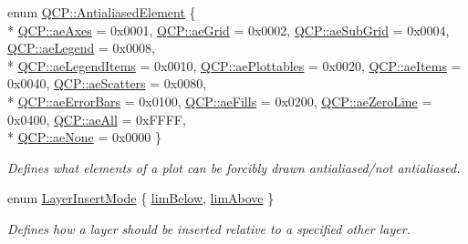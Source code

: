 \begin{DoxyCompactItemize}
enum \hyperlink{a00143_ae55dbe315d41fe80f29ba88100843a0c}{Q\+C\+P\+::\+Antialiased\+Element} \{ \\*
\hyperlink{a00143_ae55dbe315d41fe80f29ba88100843a0caefa92e89cd37f8a081fd2075aa1af73f}{Q\+C\+P\+::ae\+Axes} = 0x0001, 
\hyperlink{a00143_ae55dbe315d41fe80f29ba88100843a0ca4fbb37118d62288af0ca601ff2b07a2f}{Q\+C\+P\+::ae\+Grid} = 0x0002, 
\hyperlink{a00143_ae55dbe315d41fe80f29ba88100843a0caaedf83369188a15a69f92bb1d85ca97b}{Q\+C\+P\+::ae\+Sub\+Grid} = 0x0004, 
\hyperlink{a00143_ae55dbe315d41fe80f29ba88100843a0ca9e0127a6361b5d0596b031a482c5cf97}{Q\+C\+P\+::ae\+Legend} = 0x0008, 
\\*
\hyperlink{a00143_ae55dbe315d41fe80f29ba88100843a0ca1aca7a50c1b95403958733a4acafe773}{Q\+C\+P\+::ae\+Legend\+Items} = 0x0010, 
\hyperlink{a00143_ae55dbe315d41fe80f29ba88100843a0ca4145e4251b0cf2dbedabeea0a38f84f6}{Q\+C\+P\+::ae\+Plottables} = 0x0020, 
\hyperlink{a00143_ae55dbe315d41fe80f29ba88100843a0caf7712a85d6b0c75b24301d2fe9484db3}{Q\+C\+P\+::ae\+Items} = 0x0040, 
\hyperlink{a00143_ae55dbe315d41fe80f29ba88100843a0cae45ed8cd167bffe27d7f40da4bc17e9c}{Q\+C\+P\+::ae\+Scatters} = 0x0080, 
\\*
\hyperlink{a00143_ae55dbe315d41fe80f29ba88100843a0ca9dcf3882cb321bb305f71fdc0f09f63d}{Q\+C\+P\+::ae\+Error\+Bars} = 0x0100, 
\hyperlink{a00143_ae55dbe315d41fe80f29ba88100843a0ca788810f0aa930137de6ad6cc6d83d354}{Q\+C\+P\+::ae\+Fills} = 0x0200, 
\hyperlink{a00143_ae55dbe315d41fe80f29ba88100843a0ca261f8ea78cf3c9561726223ffa33dc12}{Q\+C\+P\+::ae\+Zero\+Line} = 0x0400, 
\hyperlink{a00143_ae55dbe315d41fe80f29ba88100843a0caa897c232a0ffc8368e7c100ffc59ef31}{Q\+C\+P\+::ae\+All} = 0x\+F\+F\+F\+F, 
\\*
\hyperlink{a00143_ae55dbe315d41fe80f29ba88100843a0caa9e90d81896358757d94275aeaa58f6a}{Q\+C\+P\+::ae\+None} = 0x0000
 \}
\begin{DoxyCompactList}\small\item\em Defines what elements of a plot can be forcibly drawn antialiased/not antialiased. \end{DoxyCompactList}\item 
enum \hyperlink{a00116_acf68ae22e9b44e959fc82bc6366e9b8d}{Layer\+Insert\+Mode} \{ \hyperlink{a00116_acf68ae22e9b44e959fc82bc6366e9b8da571c876f0344c894acf3e70b5e1281b7}{lim\+Below}, 
\hyperlink{a00116_acf68ae22e9b44e959fc82bc6366e9b8da065748f172d5a34ffd1e09924d55cc17}{lim\+Above}
 \}
\begin{DoxyCompactList}\small\item\em Defines how a layer should be inserted relative to a specified other layer. \end{DoxyCompactList}\end{DoxyCompactItemize}
